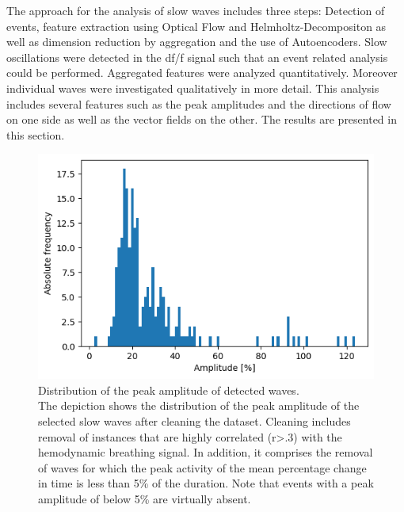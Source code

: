  The approach for the analysis of slow waves includes three steps: Detection of events, feature extraction using Optical Flow and Helmholtz-Decompositon as well as dimension reduction by aggregation and the use of Autoencoders. Slow oscillations were detected in the df/f signal such that an event related analysis could be performed. Aggregated features were analyzed quantitatively. Moreover individual waves were investigated qualitatively in more detail. This analysis includes several features such as the peak amplitudes and the directions of flow on one side as well as the vector fields on the other. The results are presented in this section.\\
 \begin{figure}[!htb]
 \centering
 \includegraphics[width=\textwidth,height=\textheight,keepaspectratio]{Figures/selected_waves_distribution_of_peak_amplitude}
 \decoRule
 \caption[Distribution of the peak amplitude of detected waves]{Distribution of the peak amplitude of detected waves.\\The depiction shows the distribution of the peak amplitude of the selected slow waves after cleaning the dataset. Cleaning includes removal of instances that are highly correlated (r>.3) with the hemodynamic breathing signal. In addition, it comprises the removal of waves for which the peak activity of the mean percentage change in time is less than 5\% of the duration. Note that events with a peak amplitude of below 5\% are virtually absent.}
 \label{fig:selected_waves_distribution_of_peak_amplitude}
 \end{figure}
